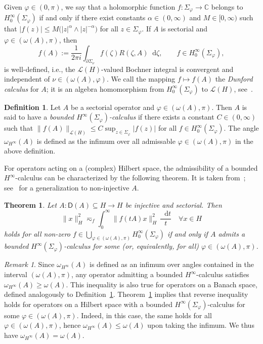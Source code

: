 \documentclass[reqno]{amsart}
\numberwithin{equation}{section}
\newcommand{\C}{\mathbb{C}}
\newcommand{\norm}[2]{     \| #1       \|_{ #2 }}
\newcommand{\rd}{\mathop{}\!\mathrm{d}}
\newcommand{\from}{\colon}
\newtheorem{theorem}[lemma]{Theorem}
\theoremstyle{remark}
\newtheorem{remark}[lemma]{Remark}
\theoremstyle{definition}
\newtheorem{definition}[lemma]{Definition}
\begin{document}
Given $\varphi\in(0,\pi)$, 
we say that a holomorphic function
$f\from \Sigma_{\varphi}\to \C$
belongs to $H^\infty_0(\Sigma_\varphi)$ 
if and only if there exist constants $\alpha\in(0,\infty)$
and $M \in [0,\infty)$
such that
$|f(z)| \leq M \bigl(|z|^\alpha \wedge |z|^{-\alpha} \bigr)$ for
all $z \in \Sigma_\varphi$.
If $A$ is sectorial
and $\varphi \in (\omega(A), \pi)$, then 
%
\[
f(A)
:= 
\frac{1}{2\pi i}
\int_{\partial \Sigma_{\nu}} f(\zeta) R(\zeta,A) \rd \zeta, 
\qquad 
f \in H^\infty_0(\Sigma_\varphi),
\]
%
is well-defined, i.e.,
the $\mathscr L(H)$-valued Bochner integral 
is convergent and independent of $\nu \in (\omega(A),\varphi)$. 
We call the mapping $f \mapsto f(A)$ the \emph{Dunford calculus}
for $A$;
it is an algebra homomorphism 
from $H^\infty_0(\Sigma_\varphi)$ to $\mathscr L(H)$, 
see~\cite[Lemma~2.3.1(a)]{Haase2006}.

\begin{definition}\label{def:bdd-Hinfty-calc}
	Let $A$ be a sectorial operator and $\varphi \in (\omega(A),\pi)$. 
	Then $A$ is said to have a 
	\emph{bounded $H^\infty(\Sigma_\varphi)$-calculus} if
	there exists a constant $C \in (0,\infty)$ such that
	$\norm{f(A)}{\mathscr L(H)} 
	\leq  
	C
	\sup_{z\in \Sigma_\varphi}|f(z)|$
	for all $f \in H^\infty_0(\Sigma_\varphi)$.
	The angle $\omega_{H^\infty}(A)$ is defined as the infimum over 
	all admissable $\varphi \in (\omega(A),\pi)$ in the above definition.
\end{definition}

For operators acting on a (complex) Hilbert space, the admissibility of 
a bounded $H^\infty$-calculus
can be characterized by the following theorem. 
It is taken from~\cite[Theorem~7.3.1]{Haase2006}; 
see~\cite[Theorem~10.4.21]{AnalysisInBanachSpacesII} for a generalization
to non-injective $A$.

\begin{theorem}\label{thm:mcintosh}
	Let $A\from \mathsf D(A)\subseteq H \to H$ be injective and sectorial.
	Then
	\[
	\norm{x}{H}^2 
	\eqsim_f
	\int_0^\infty \norm{f(tA) x}{H}^2 \, \frac{\rd t}{t}
	\quad \forall x \in H
	\]
	holds for all non-zero
	$f \in \bigcup_{\varphi\in(\omega(A),\pi)} H_0^\infty(\Sigma_{\varphi})$
	if and only if
	$A$ admits a bounded $H^\infty(\Sigma_\varphi)$-calculus
	for some (or, equivalently, for all)
	$\varphi\in(\omega(A),\pi)$.
\end{theorem}

\begin{remark}\label{rem:Hinfty-sectoriality-angles}
	Since $\omega_{H^\infty}(A)$ is defined as an infimum
	over angles contained in the interval $(\omega(A),\pi)$, any
	operator admitting a bounded $H^\infty$-calculus satisfies
	$\omega_{H^\infty}(A) \ge \omega(A)$. This inequality is also true
	for operators on a Banach space, defined analogously to Definition~\ref{def:bdd-Hinfty-calc}.
	Theorem~\ref{thm:mcintosh} implies that reverse inequality holds
	for operators on a Hilbert space with a bounded $H^\infty(\Sigma_\varphi)$-calculus
	for some $\varphi\in(\omega(A),\pi)$. Indeed, in this case, the same holds
	for all $\varphi \in (\omega(A),\pi)$, hence 
	$\omega_{H^\infty}(A) \le \omega(A)$ upon taking the infimum.
	We thus have $\omega_{H^\infty}(A)=\omega(A)$.
\end{remark}
\end{document}
